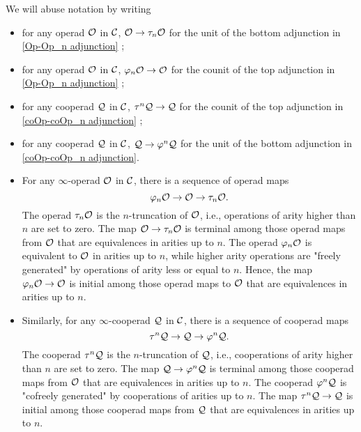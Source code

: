 \begin{notation}
	We will abuse notation by writing 
	\begin{itemize}
	    \item 
	    for any operad ${\mathcal{O}}$ in ${\mathcal{C}}$,
	${\mathcal{O}} \to \tau_{n} {\mathcal{O}}$
	for the unit of the bottom adjunction in \eqref{Op-Op_n adjunction} ;
	\item 
	for any operad ${\mathcal{O}}$ in ${\mathcal{C}}$,
	$
	\varphi_n {\mathcal{O}} \to {\mathcal{O}}
	$ for the counit of the top adjunction in \eqref{Op-Op_n adjunction} ;
	\item 	for any cooperad ${\mathcal{Q}}$ in ${\mathcal{C}}$, $\tau^n {\mathcal{Q}} \to {\mathcal{Q}}$ for the counit of the top adjunction in \eqref{coOp-coOp_n adjunction} ;
	\item 	
	for any cooperad ${\mathcal{Q}}$ in ${\mathcal{C}}$, 
	$
	{\mathcal{Q}} \to \varphi^n {\mathcal{Q}}
	$
	for the unit of the bottom adjunction in \eqref{coOp-coOp_n adjunction}.
	\end{itemize}
\end{notation}

\begin{remark}
\begin{itemize}
	\item For any $\infty$-operad ${\mathcal{O}}$ in ${\mathcal{C}}$, there is a sequence of operad maps
	\[
	\varphi_n{\mathcal{O}} \to {\mathcal{O}} \to \tau_n {\mathcal{O}}.
	\]
	The operad $\tau_n{\mathcal{O}}$ is the $n$-truncation of ${\mathcal{O}}$, i.e., operations of arity higher than $n$ are set to zero.
	The map ${\mathcal{O}} \to \tau_n {\mathcal{O}}$ is terminal among those operad maps from ${\mathcal{O}}$ that are equivalences in arities up to $n$.
	The operad $\varphi_n{\mathcal{O}}$ is equivalent to ${\mathcal{O}}$ in arities up to $n$, while higher arity operations are "freely generated" by operations of arity less or equal to $n$.
	Hence, the map $\varphi_n{\mathcal{O}} \to {\mathcal{O}}$ is initial among those operad maps to ${\mathcal{O}}$ that are equivalences in arities up to $n$.

	\item Similarly, for any $\infty$-cooperad ${\mathcal{Q}}$ in ${\mathcal{C}}$, there is a sequence of  cooperad maps
	\[
	\tau^n {\mathcal{Q}} \to {\mathcal{Q}} \to \varphi^n {\mathcal{Q}}.
	\]
	The cooperad $\tau^n{\mathcal{Q}}$ is the $n$-truncation of ${\mathcal{Q}}$, i.e., cooperations of arity higher than $n$ are set to zero. The map ${\mathcal{Q}} \to \varphi^n{\mathcal{Q}}$ is terminal among those cooperad maps from ${\mathcal{O}}$ that are equivalences in arities up to $n$.
    The cooperad $\varphi^n {\mathcal{Q}}$ is "cofreely generated" by cooperations of arities up to $n$.
    The map $\tau^n{\mathcal{Q}} \to {\mathcal{Q}}$ is initial among those cooperad maps from ${\mathcal{Q}}$ that are equivalences in arities up to $n$.
\end{itemize}
\end{remark}


